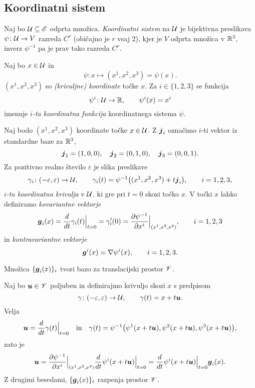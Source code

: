 \subsection{Koordinatni sistem}


\begin{definicija}
	Naj bo $\mathcal U\subseteq\mathscr E$ odprta množica. \emph{Koordinatni sistem} na $\mathcal U$ je bijektivna
	preslikava $\psi\colon \mathcal U\to V$ razreda $C^r$ (običajno je $r$ vsaj 2), kjer je $V$ odprta
	množica v $\mathbb R^3$, inverz $\psi^{-1}$ pa je prav tako razreda $C^r$.
\end{definicija}

Naj bo $x\in \mathcal U$ in
\[ \psi\colon x\mapsto (x^1,x^2,x^3)=\psi(x). \]
$(x^1,x^2,x^3)$ so \emph{(krivuljne) koordinate} točke $x$.
Za $i\in\{1,2,3\}$ se funkcija
\[ \psi^i\colon \mathcal U\to\mathbb R,\qquad \psi^i(x)=x^i \]
imenuje \emph{$i$-ta koordinatna funkcija} koordinatnega sistema $\psi$.

Naj bodo $(x^1,x^2,x^3)$ koordinate točke $x\in \mathcal U$. Z $\boldsymbol j_i$ označimo
$i$-ti vektor iz standardne baze za $\mathbb R^3$,
\[ \boldsymbol j_1=(1,0,0),\quad\boldsymbol j_2=(0,1,0),\quad\boldsymbol j_3=(0,0,1). \]
Za pozitivno realno število $\varepsilon$ je slika preslikave
\begin{equation} \label{e:kokri}
	\gamma_i\colon(-\varepsilon,\varepsilon)\to \mathcal U,\qquad
	\gamma_i(t)=\psi^{-1}\big((x^1,x^2,x^3)+t\boldsymbol j_i\big),\qquad i=1,2,3,
\end{equation}
\emph{$i$-ta koordinatna krivulja} v $\mathcal U$, ki gre pri $t=0$ skozi točko $x$.
V točki $x$ lahko definiramo \emph{kovariantne vektorje}
\begin{equation} \label{e:tanvek}
	\boldsymbol g_i(x)=\frac{d}{dt}\gamma_i(t)\Big|_{t=0}=\gamma_i'(0)
	=\frac{\partial\psi^{-1}}{\partial x^i}\Big|_{(x^1,x^2,x^3)}
	, \qquad i=1,2,3
\end{equation}
in \emph{kontravariantne vektorje}
\begin{equation} \label{e:gradvek}
	\boldsymbol g^i(x)=\nabla\psi^i(x),\qquad i=1,2,3.
\end{equation}

\begin{trditev}
	Množica $\{\boldsymbol g_i(x)\}_i$ tvori bazo za translacijski prostor $\mathscr V$.
\end{trditev}

\proof
	Naj bo $\boldsymbol u\in\mathscr V$ poljuben in definirajmo krivuljo skozi $x$ s predpisom
	\[ \gamma\colon(-\varepsilon,\varepsilon)\to \mathcal U,\qquad \gamma(t)=x+t\boldsymbol u. \]
	Velja
	\[
		\boldsymbol u=\frac{d}{dt}\gamma(t)\Big|_{t=0}\quad\textrm{in}\quad
		\gamma(t)=\psi^{-1}\big(\psi^1(x+t\boldsymbol u),\psi^2(x+t\boldsymbol u),\psi^3(x+t\boldsymbol u)\big),
	\]
	zato je
	\[
		\boldsymbol u=
		\frac{\partial\psi^{-1}}{\partial x^i}\Big|_{(x^1,x^2,x^3)}
		\frac{d}{dt}\psi^i(x+t\boldsymbol u)\Big|_{t=0}=
		\frac{d}{dt}\psi^i(x+t\boldsymbol u)\Big|_{t=0}\boldsymbol g_i(x).
	\]
	Z drugimi besedami, $\{\boldsymbol g_i(x)\}_{i}$ razpenja prostor $\mathscr V$.
\endproof

